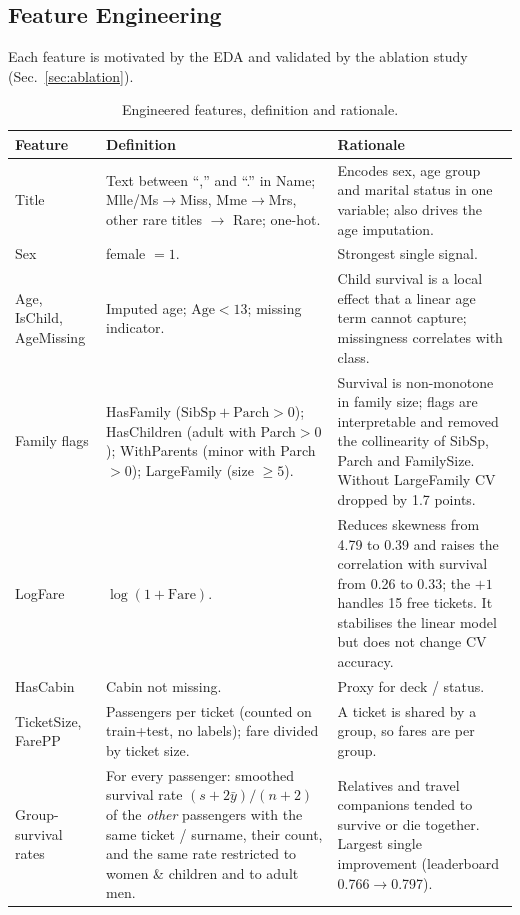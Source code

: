 \documentclass[10pt,twocolumn]{article}
\begin{document}
\subsection{Feature Engineering}\label{sec:fe}
Each feature is motivated by the EDA and validated by the ablation study (Sec.~\ref{sec:ablation}).
\begin{table}[t]
\centering\small
\caption{Engineered features, definition and rationale.}
\label{tab:fe}
\begin{tabular}{p{2.6cm}p{6.5cm}p{7.2cm}}
\toprule
Feature & Definition & Rationale \\
\midrule
Title & Text between ``,'' and ``.'' in Name; Mlle/Ms$\to$Miss, Mme$\to$Mrs, other rare titles $\to$ Rare; one-hot. & Encodes sex, age group and marital status in one variable; also drives the age imputation. \\
Sex & female $=1$. & Strongest single signal. \\
Age, IsChild, AgeMissing & Imputed age; $\text{Age}<13$; missing indicator. & Child survival is a local effect that a linear age term cannot capture; missingness correlates with class. \\
Family flags & HasFamily ($\text{SibSp}+\text{Parch}>0$); HasChildren (adult with Parch$>0$); WithParents (minor with Parch$>0$); LargeFamily (size $\ge5$). & Survival is non-monotone in family size; flags are interpretable and removed the collinearity of SibSp, Parch and FamilySize. Without LargeFamily CV dropped by 1.7 points. \\
LogFare & $\log(1+\text{Fare})$. & Reduces skewness from 4.79 to 0.39 and raises the correlation with survival from 0.26 to 0.33; the $+1$ handles 15 free tickets. It stabilises the linear model but does not change CV accuracy. \\
HasCabin & Cabin not missing. & Proxy for deck / status. \\
TicketSize, FarePP & Passengers per ticket (counted on train+test, no labels); fare divided by ticket size. & A ticket is shared by a group, so fares are per group. \\
Group-survival rates & For every passenger: smoothed survival rate $(s+2\bar y)/(n+2)$ of the \emph{other} passengers with the same ticket / surname, their count, and the same rate restricted to women \& children and to adult men. & Relatives and travel companions tended to survive or die together. Largest single improvement (leaderboard 0.766$\to$0.797). \\
\bottomrule
\end{tabular}
\end{table}
\end{document}
